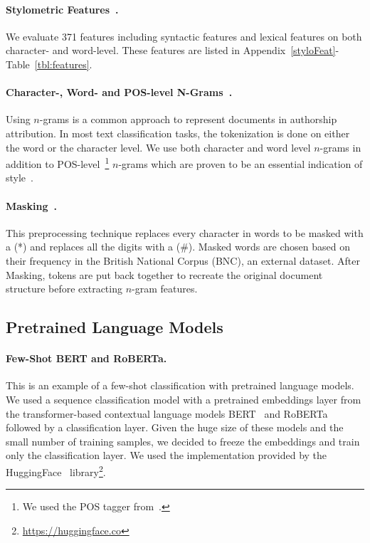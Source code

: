 \documentclass[11pt]{article}
\begin{document}
\paragraph{Stylometric Features~\citep{Iqbal.F:2008,Iqbal.F:2013}.}
We evaluate 371 features including syntactic features and lexical features on both character- and word-level. These features are listed in Appendix~\ref{styloFeat}-Table~\ref{tbl:features}.

\paragraph{Character-, Word- and POS-level N-Grams~\citep{Stamatatos.E:2013,Sapkota.U:2014,sapkota2015not}.}
Using $n$-grams is a common approach to represent documents in authorship attribution. In most text classification tasks, the tokenization is done on either the word or the character level. We use both character and word level $n$-grams in addition to POS-level~\footnote{We used the POS tagger from~\citep{manning2014stanford}.} $n$-grams which are proven to be an essential indication of style~\citep{Ding.S:2015,sundararajan2018represents}. 

\paragraph{Masking~\citep{Stamatatos.E:2017,stamatatos2018masking}.}
This preprocessing technique replaces every character in words to be masked with a (*) and replaces all the digits with a ($\#$). Masked words are chosen based on their frequency in the British National Corpus (BNC), an external dataset. After Masking, tokens are put back together to recreate the original document structure before extracting $n$-gram features. 

\subsection{Pretrained Language Models}

\paragraph{Few-Shot BERT and RoBERTa.}
This is an example of a few-shot classification with pretrained language models. We used a sequence classification model with a pretrained embeddings layer from the transformer-based contextual language models BERT~\citet{devlin2019bert} and RoBERTa~\citep{liu2019roberta} followed by a classification layer. Given the huge size of these models and the small number of training samples, we decided to freeze the embeddings and train only the classification layer. We used the implementation provided by the HuggingFace~\citep{Wolf2019HuggingFacesTS} library\footnote{\url{https://huggingface.co}}.
\end{document}
